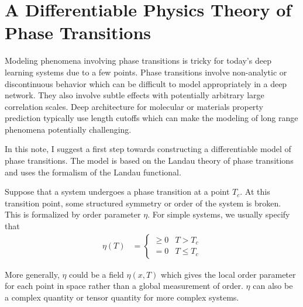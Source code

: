 \documentclass[book.tex]{subfiles}
\begin{document}
\chapter{A Differentiable Physics Theory of Phase Transitions}

Modeling phenomena involving phase transitions is tricky for today's deep learning systems due to a few points. Phase transitions involve non-analytic or discontinuous behavior which can be difficult to model appropriately in a deep network. They also involve subtle effects with potentially arbitrary large correlation scales. Deep architecture for molecular or materials property prediction typically use length cutoffs which can make the modeling of long range phenomena potentially challenging.

In this note, I suggest a first step towards constructing a differentiable model of phase transitions. The model is based on the Landau theory of phase transitions and uses the formalism of the Landau functional. 

Suppose that a system undergoes a phase transition at a point $T_c$. At this transition point, some structured symmetry or order of the system is broken. This is formalized by order parameter $\eta$. For simple systems, we usually specify that 
\begin{align}
\eta(T) &= \begin{cases}
\geq 0 & T > T_c \\
= 0 & T \leq T_c 
\end{cases}
\end{align}

More generally, $\eta$ could be a field $\eta(x, T)$ which gives the local order parameter for each point in space rather than a global measurement of order. $\eta$ can also be a complex quantity or tensor quantity for more complex systems.
\end{document}
